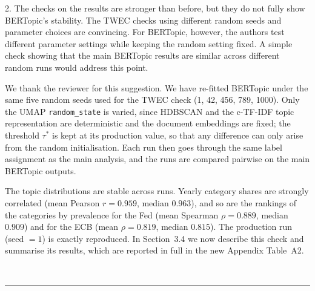 \documentclass{report}
\theoremstyle{plain}
\begin{document}
2. The checks on the results are stronger than before, but they do not fully show BERTopic's stability. The TWEC checks using different random seeds and parameter choices are convincing. For BERTopic, however, the authors test different parameter settings while keeping the random setting fixed. A simple check showing that the main BERTopic results are similar across different random runs would address this point.
\\
{\color{orange}
We thank the reviewer for this suggestion. We have re-fitted BERTopic under the same five random seeds used for the TWEC check (1, 42, 456, 789, 1000). Only the UMAP \texttt{random\_state} is varied, since HDBSCAN and the c-TF-IDF topic representation are deterministic and the document embeddings are fixed; the threshold $\tau^*$ is kept at its production value, so that any difference can only arise from the random initialisation. Each run then goes through the same label assignment as the main analysis, and the runs are compared pairwise on the main BERTopic outputs.

The topic distributions are stable across runs. Yearly category shares are strongly correlated (mean Pearson $r = 0.959$, median $0.963$), and so are the rankings of the categories by prevalence for the Fed (mean Spearman $\rho = 0.889$, median $0.909$) and for the ECB (mean $\rho = 0.819$, median $0.815$). The production run (seed $=1$) is exactly reproduced. In Section~3.4 we now describe this check and summarise its results, which are reported in full in the new Appendix Table~A2.
}
\\
\noindent\rule{15cm}{0.4pt}
\end{document}
